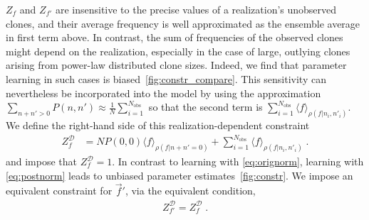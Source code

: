 \documentclass[letterpaper,english,prl,reprint,longbibliography]{revtex4-1} %
\begin{document}
$Z_f$ and $Z_{f'}$ are insensitive to the precise values of a realization's unobserved clones, and their average frequency is well approximated as the ensemble average in first term above. In contrast, the sum of frequencies of the observed clones might depend on the realization, especially in the case of large, outlying clones arising from power-law distributed clone sizes. Indeed, we find that parameter learning in such cases is biased~\ref{fig:constr_compare}. This sensitivity can nevertheless be incorporated into the model by using the approximation $\sum_{n+n'>0}P(n,n')\approx \frac{1}{N}\sum_{i=1}^{N_\textrm{obs}}$ so that the second term is $\sum_{i=1}^{N_{\textrm{obs}}}\langle f\rangle_{\rho(f|n_i,n'_i)}$. We define the right-hand side of this realization-dependent constraint 
\begin{align}
	Z^\mathcal{D}_f&= N	P(0,0)\langle f\rangle_{\rho(f|n+n'=0)} + \sum_{i=1}^{N_{\textrm{obs}}}\langle f\rangle_{\rho(f|n_i,n'_i)}\;.\label{eq:postnorm}
\end{align}
and impose that $Z^\mathcal{D}_f=1$. In contrast to learning with \ref{eq:orignorm}, learning with \ref{eq:postnorm} leads to unbiased parameter estimates~\ref{fig:constr}. We impose an equivalent constraint for $\vec{f}'$, via the equivalent condition, 
\begin{align}
	Z^\mathcal{D}_{f'}=Z^\mathcal{D}_f\;.\label{eq:fprimeconst}
\end{align}

\end{document}
